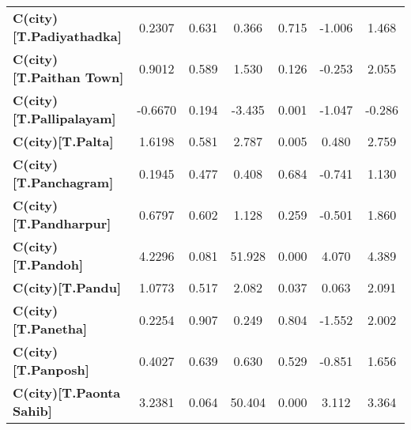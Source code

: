 \begin{center}
\begin{tabular}{lcccccc}
\textbf{C(city)[T.Padiyathadka]}                                                                    &       0.2307  &        0.631     &     0.366  &         0.715        &       -1.006    &        1.468     \\
\textbf{C(city)[T.Paithan Town]}                                                                    &       0.9012  &        0.589     &     1.530  &         0.126        &       -0.253    &        2.055     \\
\textbf{C(city)[T.Pallipalayam]}                                                                    &      -0.6670  &        0.194     &    -3.435  &         0.001        &       -1.047    &       -0.286     \\
\textbf{C(city)[T.Palta]}                                                                           &       1.6198  &        0.581     &     2.787  &         0.005        &        0.480    &        2.759     \\
\textbf{C(city)[T.Panchagram]}                                                                      &       0.1945  &        0.477     &     0.408  &         0.684        &       -0.741    &        1.130     \\
\textbf{C(city)[T.Pandharpur]}                                                                      &       0.6797  &        0.602     &     1.128  &         0.259        &       -0.501    &        1.860     \\
\textbf{C(city)[T.Pandoh]}                                                                          &       4.2296  &        0.081     &    51.928  &         0.000        &        4.070    &        4.389     \\
\textbf{C(city)[T.Pandu]}                                                                           &       1.0773  &        0.517     &     2.082  &         0.037        &        0.063    &        2.091     \\
\textbf{C(city)[T.Panetha]}                                                                         &       0.2254  &        0.907     &     0.249  &         0.804        &       -1.552    &        2.002     \\
\textbf{C(city)[T.Panposh]}                                                                         &       0.4027  &        0.639     &     0.630  &         0.529        &       -0.851    &        1.656     \\
\textbf{C(city)[T.Paonta Sahib]}                                                                    &       3.2381  &        0.064     &    50.404  &         0.000        &        3.112    &        3.364     \\

\end{tabular}
\end{center}
